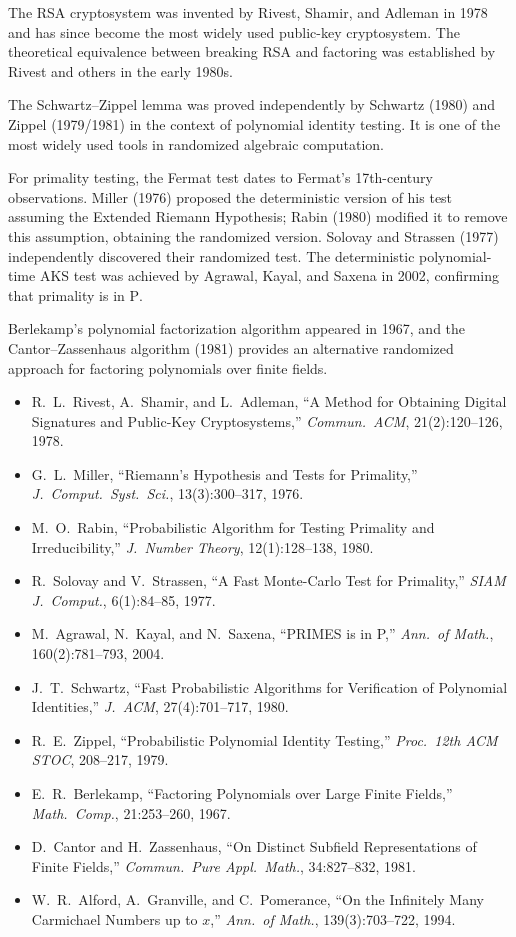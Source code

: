 \documentclass[twoside,12pt]{book}
\theoremstyle{plain}
\theoremstyle{definition}
\theoremstyle{remark}
\begin{document}
The RSA cryptosystem was invented by Rivest, Shamir, and Adleman in 1978 and has since become the most widely used public-key cryptosystem. The theoretical equivalence between breaking RSA and factoring was established by Rivest and others in the early 1980s.

The Schwartz--Zippel lemma was proved independently by Schwartz (1980) and Zippel (1979/1981) in the context of polynomial identity testing. It is one of the most widely used tools in randomized algebraic computation.

For primality testing, the Fermat test dates to Fermat's 17th-century observations. Miller (1976) proposed the deterministic version of his test assuming the Extended Riemann Hypothesis; Rabin (1980) modified it to remove this assumption, obtaining the randomized version. Solovay and Strassen (1977) independently discovered their randomized test. The deterministic polynomial-time AKS test was achieved by Agrawal, Kayal, and Saxena in 2002, confirming that primality is in $\text{P}$.

Berlekamp's polynomial factorization algorithm appeared in 1967, and the Cantor--Zassenhaus algorithm (1981) provides an alternative randomized approach for factoring polynomials over finite fields.

\begin{itemize}[nosep]
    \item R.~L.~Rivest, A.~Shamir, and L.~Adleman, ``A Method for Obtaining Digital Signatures and Public-Key Cryptosystems,'' \textit{Commun.\ ACM}, 21(2):120--126, 1978.
    \item G.~L.~Miller, ``Riemann's Hypothesis and Tests for Primality,'' \textit{J.\ Comput.\ Syst.\ Sci.}, 13(3):300--317, 1976.
    \item M.~O.~Rabin, ``Probabilistic Algorithm for Testing Primality and Irreducibility,'' \textit{J.\ Number Theory}, 12(1):128--138, 1980.
    \item R.~Solovay and V.~Strassen, ``A Fast Monte-Carlo Test for Primality,'' \textit{SIAM J.\ Comput.}, 6(1):84--85, 1977.
    \item M.~Agrawal, N.~Kayal, and N.~Saxena, ``PRIMES is in P,'' \textit{Ann.\ of Math.}, 160(2):781--793, 2004.
    \item J.~T.~Schwartz, ``Fast Probabilistic Algorithms for Verification of Polynomial Identities,'' \textit{J.\ ACM}, 27(4):701--717, 1980.
    \item R.~E.~Zippel, ``Probabilistic Polynomial Identity Testing,'' \textit{Proc.\ 12th ACM STOC}, 208--217, 1979.
    \item E.~R.~Berlekamp, ``Factoring Polynomials over Large Finite Fields,'' \textit{Math.\ Comp.}, 21:253--260, 1967.
    \item D.~Cantor and H.~Zassenhaus, ``On Distinct Subfield Representations of Finite Fields,'' \textit{Commun.\ Pure Appl.\ Math.}, 34:827--832, 1981.
    \item W.~R.~Alford, A.~Granville, and C.~Pomerance, ``On the Infinitely Many Carmichael Numbers up to $x$,'' \textit{Ann.\ of Math.}, 139(3):703--722, 1994.
\end{itemize}
\end{document}
